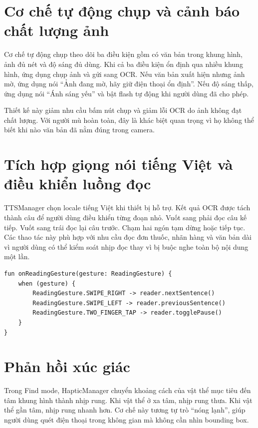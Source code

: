 \documentclass[a4paper,13pt]{report}
\begin{document}
\section{Cơ chế tự động chụp và cảnh báo chất lượng ảnh}

Cơ chế tự động chụp theo dõi ba điều kiện gồm có văn bản trong khung hình, ảnh đủ nét và độ sáng đủ dùng. Khi cả ba điều kiện ổn định qua nhiều khung hình, ứng dụng chụp ảnh và gửi sang OCR. Nếu văn bản xuất hiện nhưng ảnh mờ, ứng dụng nói ``Ảnh đang mờ, hãy giữ điện thoại ổn định''. Nếu độ sáng thấp, ứng dụng nói ``Ánh sáng yếu'' và bật flash tự động khi người dùng đã cho phép.

Thiết kế này giảm nhu cầu bấm nút chụp và giảm lỗi OCR do ảnh không đạt chất lượng. Với người mù hoàn toàn, đây là khác biệt quan trọng vì họ không thể biết khi nào văn bản đã nằm đúng trong camera.

\section{Tích hợp giọng nói tiếng Việt và điều khiển luồng đọc}

TTSManager chọn locale tiếng Việt khi thiết bị hỗ trợ. Kết quả OCR được tách thành câu để người dùng điều khiển từng đoạn nhỏ. Vuốt sang phải đọc câu kế tiếp. Vuốt sang trái đọc lại câu trước. Chạm hai ngón tạm dừng hoặc tiếp tục. Các thao tác này phù hợp với nhu cầu đọc đơn thuốc, nhãn hàng và văn bản dài vì người dùng có thể kiểm soát nhịp đọc thay vì bị buộc nghe toàn bộ nội dung một lần.

\begin{lstlisting}[caption={Ánh xạ cử chỉ điều khiển luồng đọc}]
fun onReadingGesture(gesture: ReadingGesture) {
    when (gesture) {
        ReadingGesture.SWIPE_RIGHT -> reader.nextSentence()
        ReadingGesture.SWIPE_LEFT -> reader.previousSentence()
        ReadingGesture.TWO_FINGER_TAP -> reader.togglePause()
    }
}
\end{lstlisting}

\section{Phản hồi xúc giác}

Trong Find mode, HapticManager chuyển khoảng cách của vật thể mục tiêu đến tâm khung hình thành nhịp rung. Khi vật thể ở xa tâm, nhịp rung thưa. Khi vật thể gần tâm, nhịp rung nhanh hơn. Cơ chế này tương tự trò ``nóng lạnh'', giúp người dùng quét điện thoại trong không gian mà không cần nhìn bounding box.
\end{document}
